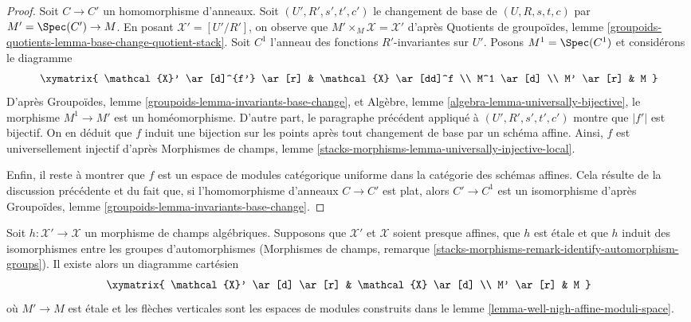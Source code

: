 \begin{proof}
\medskip\noindent
Soit $C \to C'$ un homomorphisme d'anneaux. Soit $(U', R', s', t', c')$
le changement de base de $(U, R, s, t, c)$ par $M' = \Spec(C') \to M$.
En posant $\mathcal{X}' = [U'/R']$, on observe que
$M' \times_M \mathcal{X} = \mathcal{X}'$ d'après
Quotients de groupoïdes, lemme
\ref{groupoids-quotients-lemma-base-change-quotient-stack}.
Soit $C^1$ l'anneau des fonctions $R'$-invariantes sur $U'$.
Posons $M^1 = \Spec(C^1)$ et considérons le diagramme
$$
\xymatrix{
\mathcal{X}' \ar[d]^{f'} \ar[r] & \mathcal{X} \ar[dd]^f \\
M^1 \ar[d] \\
M' \ar[r] & M
}
$$
D'après Groupoïdes, lemme \ref{groupoids-lemma-invariants-base-change}, et
Algèbre, lemme \ref{algebra-lemma-universally-bijective},
le morphisme $M^1 \to M'$ est un homéomorphisme.
D'autre part, le paragraphe précédent appliqué à
$(U', R', s', t', c')$ montre que $|f'|$ est bijectif.
On en déduit que $f$ induit une bijection sur les points après tout
changement de base par un schéma affine. Ainsi, $f$ est universellement injectif
d'après Morphismes de champs, lemme
\ref{stacks-morphisms-lemma-universally-injective-local}.

\medskip\noindent
Enfin, il reste à montrer que $f$ est un espace de modules catégorique uniforme
dans la catégorie des schémas affines. Cela résulte de la discussion
précédente et du fait que, si
l'homomorphisme d'anneaux $C \to C'$ est plat, alors $C' \to C^1$ est un isomorphisme
d'après Groupoïdes, lemme \ref{groupoids-lemma-invariants-base-change}.
\end{proof}

\begin{lemma}
\label{lemma-well-nigh-affine-moduli-space-etale}
Soit $h : \mathcal{X}' \to \mathcal{X}$ un morphisme de champs algébriques.
Supposons que $\mathcal{X}'$ et $\mathcal{X}$ soient presque affines,
que $h$ est \'etale et que $h$ induit des isomorphismes entre les groupes d'automorphismes
(Morphismes de champs, remarque
\ref{stacks-morphisms-remark-identify-automorphism-groups}).
Il existe alors un diagramme cartésien
$$
\xymatrix{
\mathcal{X}' \ar[d] \ar[r] & \mathcal{X} \ar[d] \\
M' \ar[r] & M
}
$$
où $M' \to M$ est \'etale et
les flèches verticales sont les espaces de modules construits dans le
lemme \ref{lemma-well-nigh-affine-moduli-space}.
\end{lemma}

